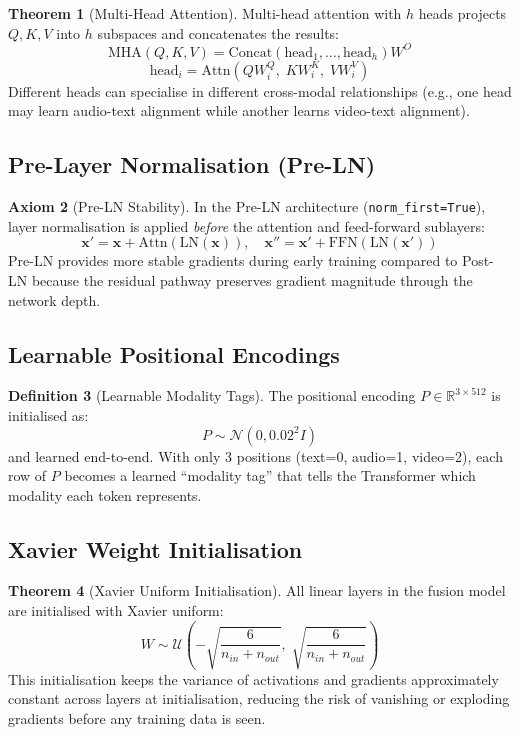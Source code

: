 \documentclass[12pt,a4paper]{article}
\theoremstyle{definition}
\newtheorem{theorem}{Theorem}[section]
\newtheorem{axiom}[theorem]{Axiom}
\newtheorem{definition}[theorem]{Definition}
\begin{document}
\begin{theorem}[Multi-Head Attention]
Multi-head attention with $h$ heads projects $Q, K, V$ into $h$ subspaces and concatenates the results:
$$\text{MHA}(Q,K,V) = \text{Concat}(\text{head}_1, \ldots, \text{head}_h)W^O$$
$$\text{head}_i = \text{Attn}(QW_i^Q,\; KW_i^K,\; VW_i^V)$$
Different heads can specialise in different cross-modal relationships (e.g., one head may learn audio-text alignment while another learns video-text alignment).
\end{theorem}

\subsection{Pre-Layer Normalisation (Pre-LN)}

\begin{axiom}[Pre-LN Stability]
In the Pre-LN architecture (\texttt{norm\_first=True}), layer normalisation is applied \emph{before} the attention and feed-forward sublayers:
$$\mathbf{x}' = \mathbf{x} + \text{Attn}(\text{LN}(\mathbf{x})), \quad \mathbf{x}'' = \mathbf{x}' + \text{FFN}(\text{LN}(\mathbf{x}'))$$
Pre-LN provides more stable gradients during early training compared to Post-LN because the residual pathway preserves gradient magnitude through the network depth.
\end{axiom}

\subsection{Learnable Positional Encodings}

\begin{definition}[Learnable Modality Tags]
The positional encoding $P \in \mathbb{R}^{3 \times 512}$ is initialised as:
$$P \sim \mathcal{N}(0, 0.02^2 I)$$
and learned end-to-end. With only 3 positions (text=0, audio=1, video=2), each row of $P$ becomes a learned ``modality tag'' that tells the Transformer which modality each token represents.
\end{definition}

\subsection{Xavier Weight Initialisation}

\begin{theorem}[Xavier Uniform Initialisation]
All linear layers in the fusion model are initialised with Xavier uniform:
$$W \sim \mathcal{U}\!\left(-\sqrt{\frac{6}{n_{in}+n_{out}}},\; \sqrt{\frac{6}{n_{in}+n_{out}}}\right)$$
This initialisation keeps the variance of activations and gradients approximately constant across layers at initialisation, reducing the risk of vanishing or exploding gradients before any training data is seen.
\end{theorem}
\end{document}

